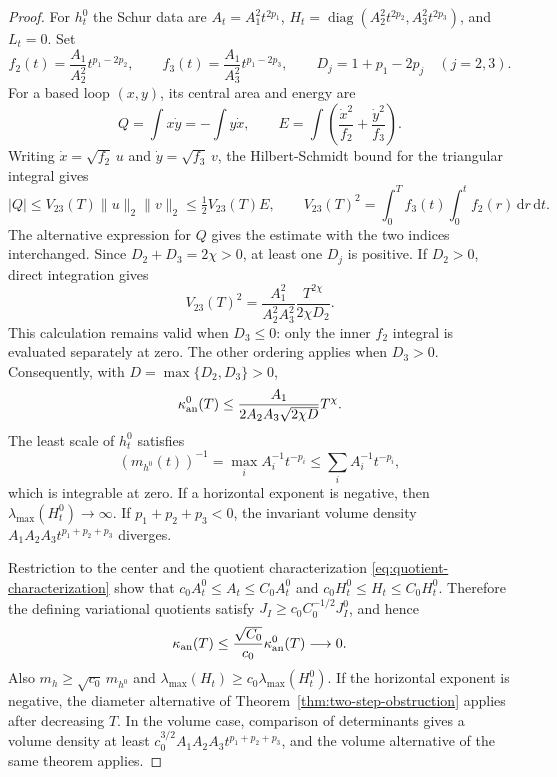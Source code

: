 \documentclass[10pt,a4paper]{article}
\numberwithin{equation}{section}
\theoremstyle{definition}
\theoremstyle{remark}
\newcommand{\dd}{\mathrm d}
\begin{document}
\begin{proof}
For $h_t^0$ the Schur data are
$A_t=A_1^2t^{2p_1}$,
$H_t=\operatorname{diag}(A_2^2t^{2p_2},A_3^2t^{2p_3})$, and $L_t=0$.
Set
\[
 f_2(t)=\frac{A_1}{A_2^2}t^{p_1-2p_2},\qquad
 f_3(t)=\frac{A_1}{A_3^2}t^{p_1-2p_3},\qquad
 D_j=1+p_1-2p_j\quad(j=2,3).
\]
For a based loop $(x,y)$, its central area and energy are
\[
 Q=\int x\dot y=-\int y\dot x,\qquad
 E=\int\left(\frac{\dot x^2}{f_2}+
                    \frac{\dot y^2}{f_3}\right).
\]
Writing $\dot x=\sqrt{f_2}\,u$ and $\dot y=\sqrt{f_3}\,v$, the
Hilbert-Schmidt bound for the triangular integral gives
\[
 |Q|\le V_{23}(T)\|u\|_2\|v\|_2
       \le\tfrac12V_{23}(T)E,\qquad
 V_{23}(T)^2=\int_0^T f_3(t)\int_0^t f_2(r)\,\dd r\,\dd t.
\]
The alternative expression for $Q$ gives the estimate with the two
indices interchanged.  Since $D_2+D_3=2\chi>0$, at least one $D_j$ is
positive.  If $D_2>0$, direct integration gives
\[
 V_{23}(T)^2=
 \frac{A_1^2}{A_2^2A_3^2}
 \frac{T^{2\chi}}{2\chi D_2}.
\]
This calculation remains valid when $D_3\le0$: only the inner
$f_2$ integral is evaluated separately at zero.  The other ordering
applies when $D_3>0$.  Consequently, with $D=\max\{D_2,D_3\}>0$,
\begin{equation}
 \kappa_{\rm an}^0(T)\le
 \frac{A_1}{2A_2A_3\sqrt{2\chi D}}T^\chi.
 \label{eq:power-ordered-bound}
\end{equation}
The least scale of $h_t^0$ satisfies
\[
 (m_{h^0}(t))^{-1}
 =\max_i A_i^{-1}t^{-p_i}
 \le\sum_i A_i^{-1}t^{-p_i},
\]
which is integrable at zero.  If a horizontal exponent is negative,
then $\lambda_{\max}(H_t^0)\to\infty$.  If $p_1+p_2+p_3<0$, the
invariant volume density $A_1A_2A_3t^{p_1+p_2+p_3}$ diverges.

Restriction to the center and the quotient characterization
\eqref{eq:quotient-characterization} show that
$c_0A_t^0\le A_t\le C_0A_t^0$ and
$c_0H_t^0\le H_t\le C_0H_t^0$.  Therefore the defining variational
quotients satisfy $J_I\ge c_0C_0^{-1/2}J_I^0$, and hence
\[
 \kappa_{\rm an}(T)\le\frac{\sqrt{C_0}}{c_0}
 \kappa_{\rm an}^0(T)\longrightarrow0.
\]
Also $m_h\ge\sqrt{c_0}\,m_{h^0}$ and
$\lambda_{\max}(H_t)\ge c_0\lambda_{\max}(H_t^0)$.
If the horizontal exponent is negative, the diameter alternative of
Theorem~\ref{thm:two-step-obstruction} applies after decreasing $T$.
In the volume case, comparison of determinants gives a volume density
at least $c_0^{3/2}A_1A_2A_3t^{p_1+p_2+p_3}$, and the volume
alternative of the same theorem applies.
\end{proof}
\end{document}
